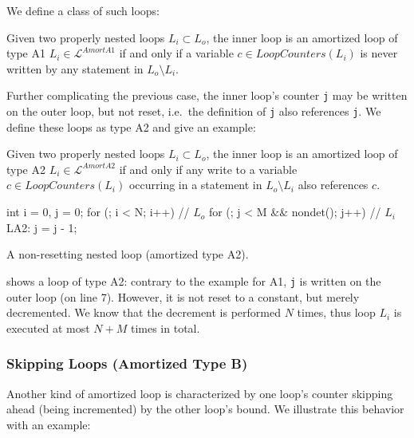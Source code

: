 We define a class of such loops:

\begin{definition}
    Given two properly nested loops $L_i \subset L_o$, the inner loop is an amortized loop of type A1 $L_i \in \mathcal{L}^{AmortA1}$ if and only if a variable $c \in LoopCounters(L_i)$ is never written by any statement in $L_o \setminus L_i$.
\end{definition}

Further complicating the previous case, the inner loop's counter \texttt{j} may be written on the outer loop, but not reset, i.e.\ the definition of \texttt{j} also references \texttt{j}. We define these loops as type A2 and give an example:

\begin{definition}
    Given two properly nested loops $L_i \subset L_o$, the inner loop is an amortized loop of type A2 $L_i \in \mathcal{L}^{AmortA2}$ if and only if any write to a variable $c \in LoopCounters(L_i)$ occurring in a statement in $L_o \setminus L_i$ also references $c$.
\end{definition}

\begin{listing}
\begin{ccode}
int i = 0,
    j = 0;
for (; i < N; i++) {                  // $L_o$
    for (; j < M && nondet(); j++) {  // $L_i$
LA2:
    }
    j = j - 1;
}
\end{ccode}
\caption{A non-resetting nested loop (amortized type A2).}
\label{lst:amorta2}
\end{listing}

\begin{example}
     shows a loop of type A2: contrary to the example for A1, \texttt{j} is written on the outer loop (on line 7). However, it is not reset to a constant, but merely decremented. We know that the decrement is performed $N$ times, thus loop $L_i$ is executed at most $N + M$ times in total.
\end{example}

\subsubsection{Skipping Loops (Amortized Type B)}

Another kind of amortized loop is characterized by one loop's counter skipping ahead (being incremented) by the other loop's bound. We illustrate this behavior with an example:

